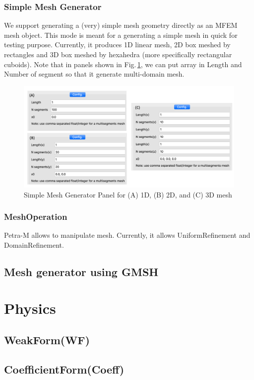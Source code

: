 \documentclass[11pt,a4paper,final]{report}
\begin{document}
\subsection{Simple Mesh Generator}
We support generating a (very) simple mesh geometry directly as an MFEM mesh object. 
This mode is meant for a generating a simple mesh in quick for testing purpose.
Currently, it produces 1D linear mesh, 2D box meshed by rectangles and 3D box meshed
by hexahedra (more specifically rectangular cuboids). 
Note that in panels shown in Fig.\,\ref{simple_mesh}, we can put array in Length and Number of 
segment so that it generate multi-domain mesh. 

\begin{figure}
\centering
\includegraphics[width=0.95\columnwidth]{figures/simple_mesh_gui.png} 
\caption{ Simple Mesh Generator Panel for (A) 1D, (B) 2D, and (C) 3D mesh }\label{simple_mesh}
\end{figure}

\subsection{MeshOperation}
Petra-M allows to manipulate mesh. Currently, it allows UniformRefinement and DomainRefinement. 

\section{Mesh generator using GMSH}
\label{GMSH_Mesh}

\chapter{Physics}
\section{WeakForm(WF)}
\section{CoefficientForm(Coeff)}
\end{document}
